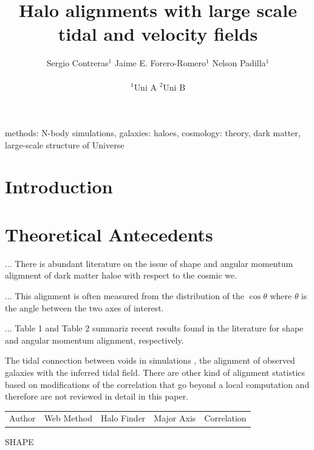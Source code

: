 \documentclass[usenatbib]{mn2e}
\begin{document}
\title[Vweb \& Tweb]{Halo alignments with large scale tidal and
  velocity fields} 
\author[S. Contreras et al.]{
\parbox[t]{\textwidth}{\raggedright 
  Sergio Contreras$^{1}$ 
  Jaime E. Forero-Romero$^{1}$ 
  Nelson Padilla$^{1}$ 
}
\vspace*{6pt}\\
$^{1}$Uni A
$^{2}$Uni B
}
\maketitle

\begin{abstract}

\end{abstract}
\begin{keywords}
methods: N-body simulations, galaxies: haloes, cosmology: theory, dark
matter, large-scale structure of Universe 
\end{keywords}


\section{Introduction}
\label{sec:introduction}


\section{Theoretical Antecedents}
\label{sec:theory}

... There is abundant literature on the issue of shape and angular momentum
aligmnent of dark matter haloe with respect to the cosmic we.

... This alignment is often measured from the distribution of the
$\cos\theta$ where $\theta$ is the angle between the two axes of
interest.

... Table 1 and Table 2 summariz recent results found in the literature for
shape and angular momentum alignment, respectively.

The tidal connection between voids in simulations \citep{Platen2008},
the alignment of observed galaxies with the inferred tidal
field\citep{Lee2007,Jones2010}. There are other kind of alignment
statistics based on modifications of the correlation
\citep{Paz2008,Faltenbacher2009} that go beyond a local computation
and therefore are not reviewed in detail in this paper.


\begin{table}
\begin{tabular}{lllll}
Author & Web Method & Halo Finder & Major Axis & Correlation\\
\end{tabular}
SHAPE
\end{table}
\end{document}
